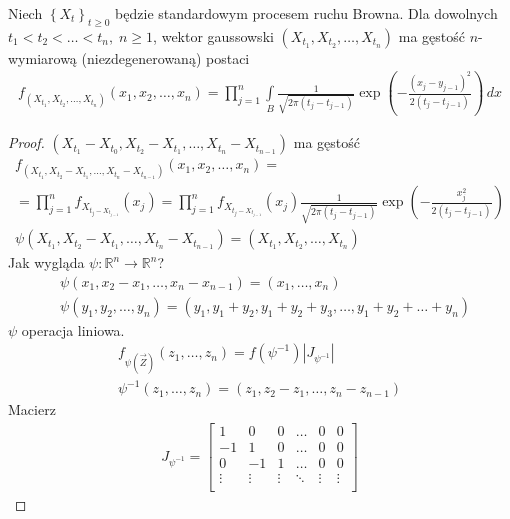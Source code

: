 \begin{twr}
Niech $ \left\{X_t\right\}_{t\ge0 } $ będzie standardowym procesem ruchu Browna. Dla dowolnych $ t_1<t_2<\dots<t_n,\;n\ge 1 $, wektor gaussowski $ \left(X_{t_1},X_{t_2},\dots,X_{t_n}\right) $ ma gęstość $ n $-wymiarową (niezdegenerowaną) postaci
\begin{gather*}
f_{\left(X_{t_1},X_{t_2},\dots,X_{t_n}\right)}
\left(x_1,x_2,\dots,x_n\right)=
\prod_{j=1}^{n}\int\limits_{B}\frac{1}{\sqrt{2\pi(t_j-t_{j-1})}}\exp\left(-\frac{\left(x_j-y_{j-1}\right)^2}{2\left(t_j-t_{j-1}\right)}\right)\,dx
\end{gather*}
\begin{proof}
$\left(X_{t_1}-X_{t_0},X_{t_2}-X_{t_1},\dots,X_{t_n}-X_{t_{n-1}}\right) $ ma gęstość
\begin{gather*}
f_{\left(X_{t_1},X_{t_2}-X_{t_1},\dots,X_{t_n}-X_{t_{n-1}}\right)}\left(x_1,x_2,\dots,x_n\right)
=\\=
\prod_{j=1}^{n}f_{X_{t_j-X_{t_{j-1}}}}(x_j)=
\prod_{j=1}^{n}f_{X_{t_j-X_{t_{j-1}}}}(x_j)
\frac{1}{\sqrt{2\pi(t_j-t_{j-1})}}\exp\left(-\frac{x_j^2}{2\left(t_j-t_{j-1}\right)}\right)\\
\psi\left(X_{t_1},X_{t_2}-X_{t_1},\dots,X_{t_n}-X_{t_{n-1}}\right)=
\left(X_{t_1},X_{t_2},\dots,X_{t_n}\right)
\end{gather*}
Jak wygląda $ \psi:\mathbb R^n\to \mathbb R ^n $?
\begin{align*}
&\psi \left(x_1,x_2-x_1,\dots,x_n-x_{n-1}\right)=
\left(x_1,\dots,x_n\right)\\
&\psi \left(y_1,y_2,\dots,y_n\right)=
\left(y_1,y_1+y_2,y_1+y_2+y_3,\dots,y_1+y_2+\dots+y_n\right)
\end{align*}
$ \psi $ operacja liniowa.
\begin{gather*}
f_{\psi\left(\vec Z\right)}\left(z_1,\dots,z_n\right)=f\left(\psi^{-1}\right)\left|J_{\psi^{-1}}\right|\\
\psi^{-1}\left(z_1,\dots,z_n\right)=\left(z_1,z_2-z_1,\dots,z_n-z_{n-1}\right)
\end{gather*}
Macierz
\begin{gather*}
J_{\psi^{-1}}=
\begin{bmatrix}
	1      & 0      & 0      & \ldots & 0      & 0      \\
	-1     & 1      & 0      & \ldots & 0      & 0      \\
	0      & -1     & 1      & \ldots & 0      & 0      \\
	\vdots & \vdots & \vdots & \ddots & \vdots & \vdots \\

\end{bmatrix}
\end{gather*}
\end{proof}
\end{twr}
